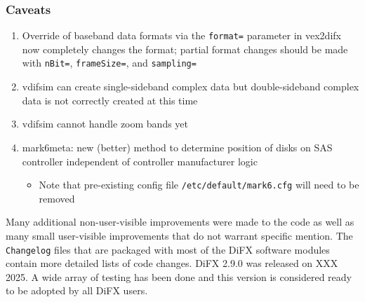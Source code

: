 \subsubsection{Caveats}
\begin{enumerate}
\item Override of baseband data formats via the {\tt format=} parameter in vex2difx now completely changes the format; partial format changes should be made with {\tt nBit=}, {\tt frameSize=}, and {\tt sampling=}
\item vdifsim can create single-sideband complex data but double-sideband complex data is not correctly created at this time
\item vdifsim cannot handle zoom bands yet
\item mark6meta: new (better) method to determine position of disks on SAS controller independent of controller manufacturer logic
\begin{itemize}
  \item Note that pre-existing config file {\tt /etc/default/mark6.cfg} will need to be removed
\end{itemize}
\end{enumerate}

Many additional non-user-visible improvements were made to the code as well as many small user-visible improvements that do not warrant specific mention.
The {\tt Changelog} files that are packaged with most of the DiFX software modules contain more detailed lists of code changes.
DiFX 2.9.0 was released on XXX 2025.
A wide array of testing has been done and this version is considered ready to be adopted by all DiFX users.



